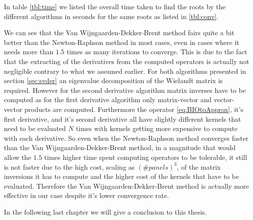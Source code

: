 \documentclass[a4paper, oneside]{thirdparty_stylesheets/discothesis}
\begin{document}
In table \ref{tbl:time} we listed the overall time taken to find the roots by the different algorithms in seconds for the same roots as listed in \ref{tbl:conv}.

\begin{table}[H]
	\centering
	\caption{Time spent in seconds until convergence for first eight minima found on our baseline problem.}
	\label{tbl:time}
\end{table}
We can see that the Van Wijngaarden-Dekker-Brent method fairs quite a bit better than the Newton-Raphson method in most cases, even in cases where it needs more than $1.5$ times as many iterations to converge.
This is due to the fact that the extracting of the derivatives from the computed operators is actually not negligible contrary to what we assumed earlier.
For both algorithms presented in section \ref{sec:svder} an eigenvalue decomposition of the Wielandt matrix is required.
However for the second derivative algorithm matrix inverses have to be computed as for the first derivative algorithm only matrix-vector and vector-vector products are computed.
Furthermore the operator \ref{eq:BIOtoApprox}, it's first derivative, and it's second derivative all have slightly different kernels that need to be evaluated $N$ times with kernels getting more expensive to compute with each derivative.
So even when the Newton-Raphson method converges faster than the Van Wijngaarden-Dekker-Brent method, in a magnitude that would allow the $1.5$ times higher time spent computing operators to be tolerable, it still is not faster due to the high cost, scaling as $(\#panels)^3$, of the matrix inversions it has to compute and the higher cost of the kernels that have to be evaluated.
Therefore the Van Wijngaarden-Dekker-Brent method is actually more effective in our case despite it's lower convergence rate.

In the following last chapter we will give a conclusion to this thesis.
\end{document}
